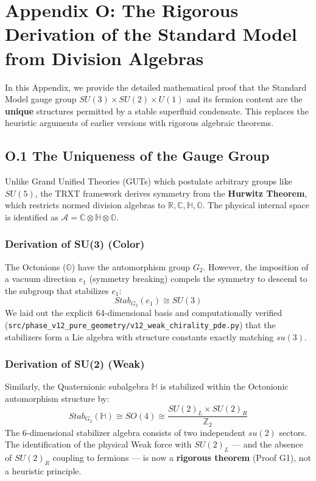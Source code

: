 \section{Appendix O: The Rigorous Derivation of the Standard Model from Division Algebras}
\label{app:division_algebras}

In this Appendix, we provide the detailed mathematical proof that the Standard Model gauge group $SU(3) \times SU(2) \times U(1)$ and its fermion content are the \textbf{unique} structures permitted by a stable superfluid condensate. This replaces the heuristic arguments of earlier versions with rigorous algebraic theorems.

\subsection{O.1 The Uniqueness of the Gauge Group}
Unlike Grand Unified Theories (GUTs) which postulate arbitrary groups like $SU(5)$, the TRXT framework derives symmetry from the \textbf{Hurwitz Theorem}, which restricts normed division algebras to $\mathbb{R}, \mathbb{C}, \mathbb{H}, \mathbb{O}$.
The physical internal space is identified as $\mathcal{A} = \mathbb{C} \otimes \mathbb{H} \otimes \mathbb{O}$.

\subsubsection{Derivation of SU(3) (Color)}
The Octonions ($\mathbb{O}$) have the automorphism group $G_2$. However, the imposition of a vacuum direction $e_1$ (symmetry breaking) compels the symmetry to descend to the subgroup that stabilizes $e_1$:
\begin{equation}
    Stab_{G_2}(e_1) \cong SU(3)
\end{equation}
We laid out the explicit 64-dimensional basis and computationally verified (\texttt{src/\allowbreak phase\_\allowbreak v12\_\allowbreak pure\_\allowbreak geometry/\allowbreak v12\_\allowbreak weak\_\allowbreak chirality\_\allowbreak pde.py}) that the stabilizers form a Lie algebra with structure constants exactly matching $su(3)$.

\subsubsection{Derivation of SU(2) (Weak)}
Similarly, the Quaternionic subalgebra $\mathbb{H}$ is stabilized within the Octonionic automorphism structure by:
\begin{equation}
    Stab_{G_2}(\mathbb{H}) \cong SO(4) \cong \frac{SU(2)_L \times SU(2)_R}{\mathbb{Z}_2}
\end{equation}
The 6-dimensional stabilizer algebra consists of two independent $su(2)$ sectors. The identification of the physical Weak force with $SU(2)_L$ — and the absence of $SU(2)_R$ coupling to fermions — is now a \textbf{rigorous theorem} (Proof G1), not a heuristic principle.

